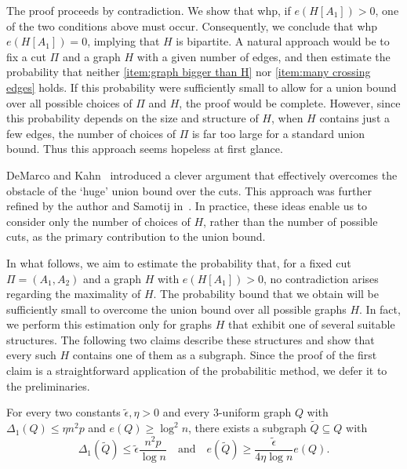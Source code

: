 \documentclass[11pt,a4paper,oneside,reqno]{amsart}
\newcommand{\1}{\mathbbm{1}} %
\renewcommand{\le}{\leqslant}
\renewcommand{\ge}{\geqslant}
\begin{document}
The proof proceeds by contradiction. We show that whp, if $e(H[A_1]) > 0$, one of the two conditions above must occur. Consequently, we conclude that whp $e(H[A_1]) = 0$, implying that $H$ is bipartite. A natural approach would be to fix a cut $\Pi$ and a graph $H$ with a given number of edges, and then estimate the probability that neither \ref{item:graph bigger than H} nor \ref{item:many crossing edges} holds. If this probability were sufficiently small to allow for a union bound over all possible choices of $\Pi$ and $H$, the proof would be complete. However, since this probability depends on the size and structure of $H$, when $H$ contains just a few edges, the number of choices of $\Pi$ is far too large for a standard union bound. Thus this approach seems hopeless at first glance.

DeMarco and Kahn~\cite{DeMKah15Tur} introduced a clever argument that effectively overcomes the obstacle of the `huge' union bound over the cuts. This approach was further refined by the author and Samotij in~\cite{hoshen2023simonovits}. In practice, these ideas enable us to consider only the number of choices of $H$, rather than the number of possible cuts, as the primary contribution to the union bound. 

In what follows, we aim to estimate the probability that, for a fixed cut $\Pi = (A_1, A_2)$ and a graph $H$ with $e(H[A_1])>0$, no contradiction arises regarding the maximality of $H$. The probability bound that we obtain will be sufficiently small to overcome the union bound over all possible graphs $H$. In fact, we perform this estimation only for graphs $H$ that exhibit one of several suitable structures. The following two claims describe these structures and show that every such $H$ contains one of them as a subgraph. Since the proof of the first claim is a straightforward application of the probabilitic method, we defer it to the preliminaries.

\begin{claim}\label{claim: subgraph-of-Q-with-low-deg}
    For every two constants $\tilde{\epsilon}, \eta >0$ and every $3$-uniform graph $Q$ with $\Delta_1(Q) \le \eta n^2 p$ and $e(Q) \ge \log^2 n$, there exists a subgraph $\tilde{Q} \subseteq Q$ with
    \[
        \Delta_1(\tilde{Q}) \le \tilde{\epsilon} \frac{n^2 p}{\log n} \quad \text{and} \quad e(\tilde{Q}) \ge \frac{\tilde{\epsilon}}{4 \eta \log n} e(Q).
    \]
\end{claim}
\end{document}
